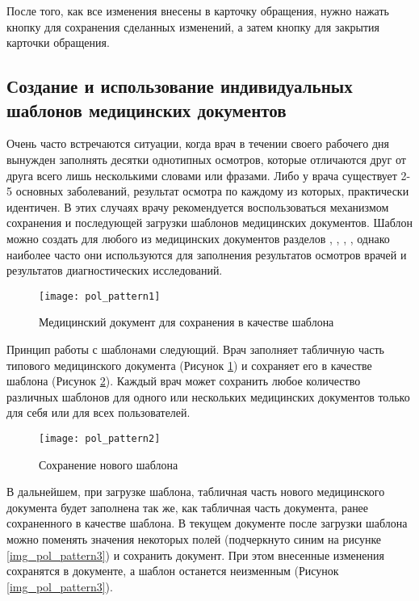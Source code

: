 После того, как все изменения внесены в карточку обращения, нужно нажать кнопку  для сохранения сделанных изменений, а затем кнопку  для закрытия карточки обращения.

\subsection{Создание и использование индивидуальных шаблонов медицинских документов} \label{pol_pattern}

Очень часто встречаются ситуации, когда врач в течении своего рабочего дня вынужден заполнять десятки однотипных осмотров, которые отличаются друг от друга всего лишь несколькими словами или фразами. Либо у врача существует 2-5 основных заболеваний, результат осмотра по каждому из которых, практически идентичен. В этих случаях врачу рекомендуется воспользоваться механизмом сохранения и последующей загрузки шаблонов медицинских документов. Шаблон можно создать для любого из медицинских документов разделов , , , , однако наиболее часто они используются для заполнения результатов осмотров врачей и результатов диагностических исследований.

 \begin{figure}[ht!]\centering
   \texttt{[image: pol\_pattern1]}
   \caption{Медицинский документ для сохранения в качестве шаблона}
   \label{img_pol_pattern1}
 \end{figure}
 
Принцип работы с шаблонами следующий. Врач заполняет табличную часть типового медицинского документа (Рисунок \ref{img_pol_pattern1}) и сохраняет его в качестве шаблона (Рисунок \ref{img_pol_pattern2}). Каждый врач может сохранить любое количество различных шаблонов для одного или нескольких медицинских документов только для себя или для всех пользователей.
 
 \begin{figure}[ht!]\centering
   \texttt{[image: pol\_pattern2]}
   \caption{Сохранение нового шаблона}
   \label{img_pol_pattern2}
 \end{figure}
 
В дальнейшем, при загрузке шаблона, табличная часть нового медицинского документа будет заполнена так же, как табличная часть документа, ранее сохраненного в качестве шаблона. В текущем документе после загрузки шаблона можно поменять значения некоторых полей (подчеркнуто синим на рисунке \ref{img_pol_pattern3}) и сохранить документ. При этом внесенные изменения сохранятся в документе, а шаблон останется неизменным (Рисунок \ref{img_pol_pattern3}).

